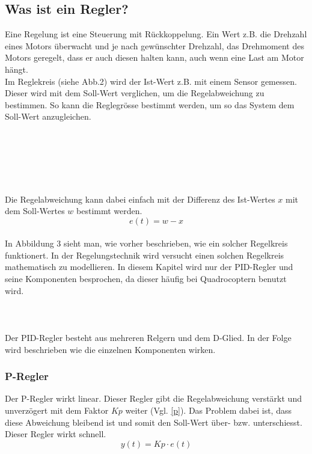\documentclass[12pt,a4paper, ngerman]{article}
\begin{document}
\subsection{Was ist ein Regler?}
Eine Regelung ist eine Steuerung mit Rückkoppelung. Ein Wert z.B. die Drehzahl eines Motors überwacht und je nach gewünschter Drehzahl, das Drehmoment des Motors geregelt, dass er auch diesen halten kann, auch wenn eine Last am Motor hängt.\cite{website:rn-wissen_Regelungstechnik}\\
Im Reglekreis (siehe Abb.2) wird der Ist-Wert z.B. mit einem Sensor gemessen. Dieser wird mit dem Soll-Wert verglichen, um die Regelabweichung zu bestimmen. So kann die Reglegrösse bestimmt werden, um so das System dem Soll-Wert anzugleichen.\\ \\ \\ \\ \\ \\ \\
Die Regelabweichung kann dabei einfach mit der Differenz des Ist-Wertes $x$ mit dem Soll-Wertes $w$ bestimmt werden.\cite{website:rn-wissen_Regelungstechnik}
\begin{equation}
e(t)=w-x
\end{equation}\\

\noindent
In Abbildung 3 sieht man, wie vorher beschrieben, wie ein solcher Regelkreis funktionert. In der Regelungstechnik wird versucht einen solchen Regelkreis mathematisch zu modellieren. In diesem Kapitel wird nur der PID-Regler und seine Komponenten besprochen, da dieser häufig bei Quadrocoptern benutzt wird.\cite{website:rn-wissen_Regelungstechnik}
\\ \\ \\ \\
Der PID-Regler besteht aus mehreren Relgern und dem D-Glied. In der Folge wird beschrieben wie die einzelnen Komponenten wirken. 

\subsubsection{P-Regler}
Der P-Regler wirkt linear. Dieser Regler gibt die Regelabweichung verstärkt und unverzögert mit dem Faktor $Kp$ weiter (Vgl. \ref{p}). Das Problem dabei ist, dass diese Abweichung bleibend ist und somit den Soll-Wert über- bzw. unterschiesst. Dieser Regler wirkt schnell.\cite{website:rn-wissen_Regelungstechnik}
\begin{equation}\label{p}
y(t)=Kp\cdot e(t)
\end{equation}
\newpage
\end{document}
